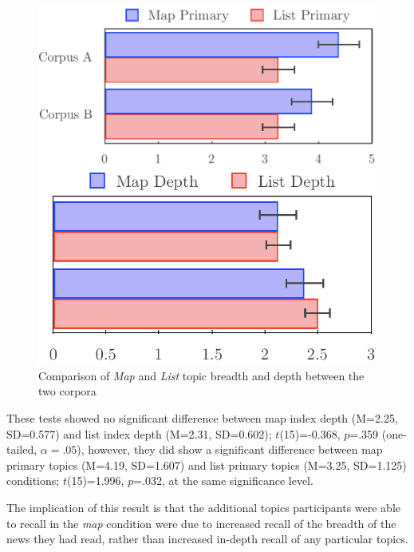\begin{figure}[htbp!]
\centering
\begin{minipage}{.5\textwidth}
  \centering
  \includegraphics[height=.48\linewidth]{img/evaluation/primary.pdf}
  \end{minipage}%
\begin{minipage}{.5\textwidth}
  \centering
  \includegraphics[height=.48\linewidth]{img/evaluation/depth.pdf}
\end{minipage}
	\caption{Comparison of \textit{Map} and \textit{List} topic breadth and depth between the two corpora}
  \label{fig:depthbreadth}
\end{figure}

These tests showed no significant difference between map index depth (M=2.25, SD=0.577) and list index depth (M=2.31, SD=0.602); $t$(15)=-0.368, $p$=.359 (one-tailed, $\alpha=.05$), however, they did show a significant difference between map primary topics (M=4.19, SD=1.607) and list primary topics (M=3.25, SD=1.125) conditions; $t$(15)=1.996, $p$=.032, at the same significance level.

The implication of this result is that the additional topics participants were able to recall in the \textit{map} condition were due to increased recall of the breadth of the news they had read, rather than increased in-depth recall of any particular topics.


